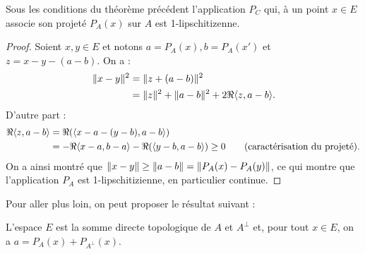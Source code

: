 \begin{thm}
Sous les conditions du théorème précédent l'application $P_C$ qui, à un point $x \in E$ associe son projeté $P_A(x)$ sur $A$ est 1-lipschitizenne.
\end{thm}

\begin{proof}
Soient $x, y \in E$ et notons $a = P_A(x), b=P_A(x')$ et $z=x-y-(a-b)$. On a :
\begin{align*}
\lVert x-y\rVert^2 & = \lVert z + (a-b)\rVert^2 \\
& = \lVert z\rVert^2 + \lVert a-b\rVert^2 + 2\Re{\langle z, a-b\rangle} . 
\end{align*}
D'autre part :
\begin{align*}
\Re{\langle z, a-b\rangle} & = \Re(\langle x-a - (y-b), a-b\rangle) \\
& = - \Re{\langle x-a, b-a\rangle} - \Re(\langle y-b, a-b\rangle) \geq 0 \qquad (\text{caractérisation du projeté}) .
\end{align*}
On a ainsi montré que $\lVert x-y\rVert \geq \lVert a-b\rVert = \lVert P_A(x) - P_A(y)\rVert$, ce qui montre que l'application $P_A$ est 1-lipschitizienne,
en particulier continue. 
\end{proof}

Pour aller plus loin, on peut proposer le résultat suivant :

\begin{thm}
L'espace $E$ est la somme directe topologique de $A$ et $A^{\perp}$ et, pour tout $x \in E$, on a $a = P_A(x)+P_{A^{\perp}}(x)$.
\end{thm}

